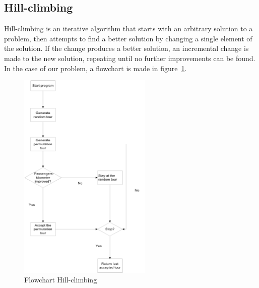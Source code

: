 \documentclass[journal]{IEEEtran}
\begin{document}
\subsection{Hill-climbing}
Hill-climbing is an iterative algorithm that starts with an arbitrary solution to a problem, then attempts to find a better solution by changing a single element of the solution. If the change produces a better solution, an incremental change is made to the new solution, repeating until no further improvements can be found.\\
In the case of our problem, a flowchart is made in figure~\ref{fig:flowchart_hc}.\\
\begin{figure}[!h]
\centering
\includegraphics[width=2.5in]{flowchart_hc}
\caption{Flowchart Hill-climbing}
\label{fig:flowchart_hc}
\end{figure}
\\
\end{document}
